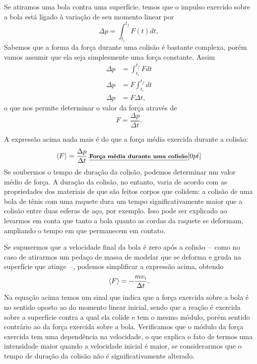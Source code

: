 Se atiramos uma bola contra uma superfície, temos que o impulso exercido sobre a bola está ligado à variação de seu momento linear por
\begin{equation}
    \Delta p = \int_{t_i}^{t_f} F(t) dt,
\end{equation}
%
Sabemos que a forma da força durante uma colisão é bastante complexa, porém vamos assumir que ela seja simplesmente uma força constante. Assim
\begin{align}
    \Delta p &= \int_{t_i}^{t_f} F dt \\
    \Delta p &= F \int_{t_i}^{t_f} dt \\
    \Delta p &= F \Delta t,
\end{align}
%
o que nos permite determinar o valor da força através de
\begin{equation}
    F = \frac{\Delta p}{\Delta t}.
\end{equation}

A expressão acima nada mais é do que a força média exercida durante a colisão:
\begin{equation}\label{Eq:ForcaMediaColisao}
    \left\langle{F}\right\rangle = \frac{\Delta p}{\Delta t}. \relax{\footnotesize\emph{\textbf{Força média durante uma colisão}}}[0pt]
\end{equation}
%
Se soubermos o tempo de duração da colisão, podemos determinar um valor médio de força. A duração da colisão, no entanto, varia de acordo com as propriedades dos materiais de que são feitos corpos que colidem: a colisão de uma bola de tênis com uma raquete dura um tempo significativamente maior que a colisão entre duas esferas de aço, por exemplo. Isso pode ser explicado ao levarmos em conta que tanto a bola quanto as cordas da raquete se deformam, ampliando o tempo em que permanecem em contato.

Se supusermos que a velocidade final da bola é zero após a colisão --~como no caso de atirarmos um pedaço de massa de modelar que se deforma e gruda na superfície que atinge~--, podemos simplificar a expressão acima, obtendo
\begin{equation}
    \left\langle{F}\right\rangle = -\frac{m v_i}{\Delta t}.
\end{equation}
%
Na equação acima temos um sinal que indica que a força exercida sobre a bola é no sentido oposto ao do momento linear inicial, sendo que a reação é exercida sobre a superfície contra a qual ela colide e tem o mesmo módulo, porém sentido contrário ao da força exercida sobre a bola. Verificamos que o módulo da força exercida tem uma dependência na velocidade, o que explica o fato de termos uma intensidade maior quando a velocidade inicial é maior, se considerarmos que o tempo de duração da colisão não é significativamente alterado.

